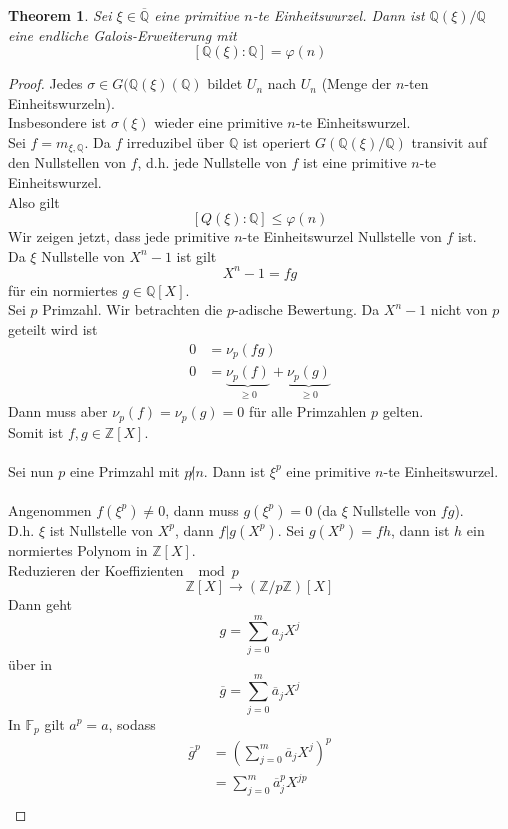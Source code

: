 \documentclass[10pt,a4paper]{article}
\newcommand{\Z}{\ensuremath{\mathbb{Z}}}
\newcommand{\Q}{\ensuremath{\mathbb{Q}}}
\newcommand{\F}{\ensuremath{\mathbb{F}}}
\newcommand{\ol}[1]{\overline{#1}}
\theoremstyle{plain}
\newtheorem{theorem}{Theorem}[section]
\theoremstyle{definition}
\theoremstyle{remark}
\begin{document}
	\begin{theorem}
		Sei $\xi\in\ol{\Q}$ eine primitive $n$-te Einheitswurzel. Dann ist $\Q(\xi)/\Q$ eine endliche Galois-Erweiterung mit 
		\[[\Q(\xi):\Q]=\varphi(n)\]
	\end{theorem}
	\begin{proof}
		Jedes $\sigma\in G(\Q(\xi)(\Q)$ bildet $U_n$ nach $U_n$ (Menge der $n$-ten Einheitswurzeln).\\
		Insbesondere ist $\sigma(\xi)$ wieder eine primitive $n$-te Einheitswurzel. \\
		Sei $f=m_{\xi,\Q}$. Da $f$  irreduzibel über $\Q$ ist operiert $G(\Q(\xi)/\Q)$ transivit auf den Nullstellen von $f$, d.h. jede Nullstelle von $f$ ist eine primitive $n$-te Einheitswurzel.\\
		Also gilt
		\[[Q(\xi):\Q]\leq\varphi(n)\]
		Wir zeigen jetzt, dass jede primitive $n$-te Einheitswurzel Nullstelle von $f$ ist.\\
		Da $\xi$ Nullstelle von $X^n-1$ ist gilt
		\[X^n-1=fg\]
		für ein normiertes $g\in\Q[X]$.\\
		Sei $p$ Primzahl. Wir betrachten die $p$-adische Bewertung. Da $X^n-1$ nicht von $p$ geteilt wird ist  %
		\begin{align*}
		0&=\nu_p(fg)\\
		0&=\underbrace{\nu_p(f)}_{\geq 0}+\underbrace{\nu_p(g)}_{\geq 0}
		\end{align*}
		Dann muss aber $\nu_p(f)=\nu_p(g)=0$ für alle Primzahlen $p$ gelten.\\
		Somit ist $f,g\in\Z[X]$.\\
		\\
		Sei nun $p$ eine Primzahl mit $p\not|n$. Dann ist $\xi^p$ eine primitive $n$-te Einheitswurzel.\\
		\\
		Angenommen $f(\xi^p)\neq0$, dann muss $g(\xi^p)=0$ (da $\xi$ Nullstelle von $fg$).\\
		D.h. $\xi$ ist Nullstelle von $X^p$, dann $f|g(X^p)$. Sei $g(X^p)=fh$, dann ist $h$ ein normiertes Polynom in $\Z[X]$.\\
		Reduzieren der Koeffizienten $\mod p$ 
		\[\Z[X]\to(\Z/p\Z)[X]\]
		Dann geht
		\[g=\sum_{j=0}^{m}a_jX^j\]
		über in
		\[\ol g=\sum_{j=0}^{m}\ol a_jX^j\]
		In $\F_p$ gilt $a^p=a$, sodass
		\begin{align*}
		\ol g^p&=\left(\sum_{j=0}^{m}\ol a_jX^j\right)^p\\
		&=\sum_{j=0}^{m}\ol a_j^pX^{jp}\\

\end{align*}
\end{proof}
\end{document}
